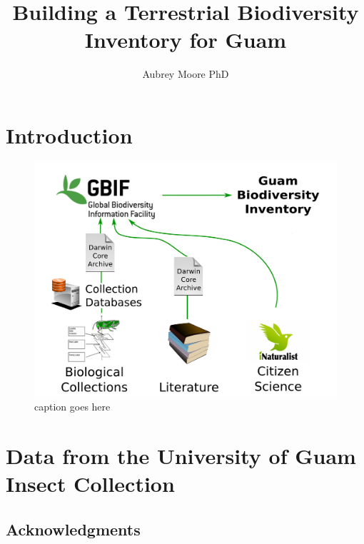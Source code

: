 \documentclass[12pt,letterpaper,english,bibliography=totocnumbered, abstract=on]{scrartcl}
\begin{document}
\titlehead{Final Report: McIntire-Stennis Project XXXX}

\title{Building a Terrestrial Biodiversity Inventory for Guam}

\author{Aubrey Moore PhD}

\maketitle
\newpage
\tableofcontents

\pagebreak

\section{Introduction}

\begin{figure}
	\includegraphics[width=\linewidth]{images/diag1}
	\caption{caption goes here}
	\label{fig:diag1}
\end{figure}


\pagebreak
\section{Data from the University of Guam Insect Collection}
\subsection{Acknowledgments}
\end{document}
